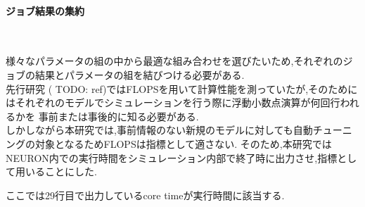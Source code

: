 \paragraph{ジョブ結果の集約}~\\
{\footnotesize

}
様々なパラメータの組の中から最適な組み合わせを選びたいため,それぞれのジョブの結果とパラメータの組を結びつける必要がある.\\
先行研究 ( TODO: ref)ではFLOPSを用いて計算性能を測っていたが,そのためにはそれぞれのモデルでシミュレーションを行う際に浮動小数点演算が何回行われるかを
事前または事後的に知る必要がある.\\
しかしながら本研究では,事前情報のない新規のモデルに対しても自動チューニングの対象となるためFLOPSは指標として適さない.
そのため,本研究ではNEURON内での実行時間をシミュレーション内部で終了時に出力させ,指標として用いることにした.\\
{\footnotesize

}
ここでは29行目で出力しているcore timeが実行時間に該当する.\\


